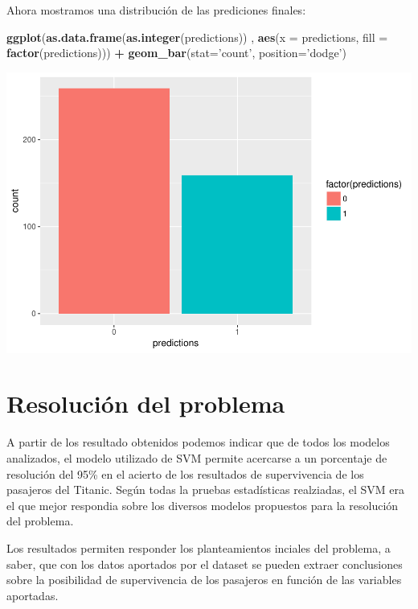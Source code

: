 \documentclass[]{article}
\newenvironment{Shaded}{\begin{snugshade}}{\end{snugshade}}
\newcommand{\KeywordTok}[1]{\textcolor[rgb]{0.13,0.29,0.53}{\textbf{#1}}}
\newcommand{\DataTypeTok}[1]{\textcolor[rgb]{0.13,0.29,0.53}{#1}}
\newcommand{\StringTok}[1]{\textcolor[rgb]{0.31,0.60,0.02}{#1}}
\newcommand{\OperatorTok}[1]{\textcolor[rgb]{0.81,0.36,0.00}{\textbf{#1}}}
\newcommand{\NormalTok}[1]{#1}
\begin{document}
Ahora mostramos una distribución de las prediciones finales:

\begin{Shaded}
\begin{Highlighting}[]
\KeywordTok{ggplot}\NormalTok{(}\KeywordTok{as.data.frame}\NormalTok{(}\KeywordTok{as.integer}\NormalTok{(predictions)) , }\KeywordTok{aes}\NormalTok{(}\DataTypeTok{x =}\NormalTok{ predictions, }\DataTypeTok{fill =} \KeywordTok{factor}\NormalTok{(predictions))) }\OperatorTok{+}
\StringTok{  }\KeywordTok{geom_bar}\NormalTok{(}\DataTypeTok{stat=}\StringTok{'count'}\NormalTok{, }\DataTypeTok{position=}\StringTok{'dodge'}\NormalTok{)}
\end{Highlighting}
\end{Shaded}

\includegraphics{titanicDataClean_files/figure-latex/prediciton_plot-1.pdf}

\section{Resolución del problema}\label{resolucion-del-problema}

A partir de los resultado obtenidos podemos indicar que de todos los
modelos analizados, el modelo utilizado de SVM permite acercarse a un
porcentaje de resolución del 95\% en el acierto de los resultados de
supervivencia de los pasajeros del Titanic. Según todas la pruebas
estadísticas realziadas, el SVM era el que mejor respondia sobre los
diversos modelos propuestos para la resolución del problema.

Los resultados permiten responder los planteamientos inciales del
problema, a saber, que con los datos aportados por el dataset se pueden
extraer conclusiones sobre la posibilidad de supervivencia de los
pasajeros en función de las variables aportadas.
\end{document}
